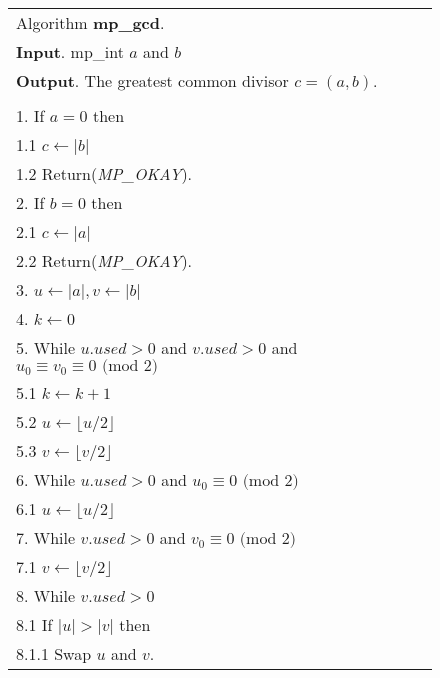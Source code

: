 \documentclass[b5paper]{book}
\begin{document}
\newpage\begin{figure}[!here]
\begin{small}
\begin{center}
\begin{tabular}{l}
\hline Algorithm \textbf{mp\_gcd}. \\
\textbf{Input}.   mp\_int $a$ and $b$ \\
\textbf{Output}.  The greatest common divisor $c = (a, b)$.  \\
\hline \\
1.  If $a = 0$ then \\
\hspace{3mm}1.1  $c \leftarrow \vert b \vert $ \\
\hspace{3mm}1.2  Return(\textit{MP\_OKAY}). \\
2.  If $b = 0$ then \\
\hspace{3mm}2.1  $c \leftarrow \vert a \vert $ \\
\hspace{3mm}2.2  Return(\textit{MP\_OKAY}). \\
3.  $u \leftarrow \vert a \vert, v \leftarrow \vert b \vert$ \\
4.  $k \leftarrow 0$ \\
5.  While $u.used > 0$ and $v.used > 0$ and $u_0 \equiv v_0 \equiv 0 \mbox{ (mod }2\mbox{)}$ \\
\hspace{3mm}5.1  $k \leftarrow k + 1$ \\
\hspace{3mm}5.2  $u \leftarrow \lfloor u / 2 \rfloor$ \\
\hspace{3mm}5.3  $v \leftarrow \lfloor v / 2 \rfloor$ \\
6.  While $u.used > 0$ and $u_0 \equiv 0 \mbox{ (mod }2\mbox{)}$ \\
\hspace{3mm}6.1  $u \leftarrow \lfloor u / 2 \rfloor$ \\
7.  While $v.used > 0$ and $v_0 \equiv 0 \mbox{ (mod }2\mbox{)}$ \\
\hspace{3mm}7.1  $v \leftarrow \lfloor v / 2 \rfloor$ \\
8.  While $v.used > 0$ \\
\hspace{3mm}8.1  If $\vert u \vert > \vert v \vert$ then \\
\hspace{6mm}8.1.1  Swap $u$ and $v$. \\

\end{tabular}
\end{center}
\end{small}
\end{figure}
\end{document}

